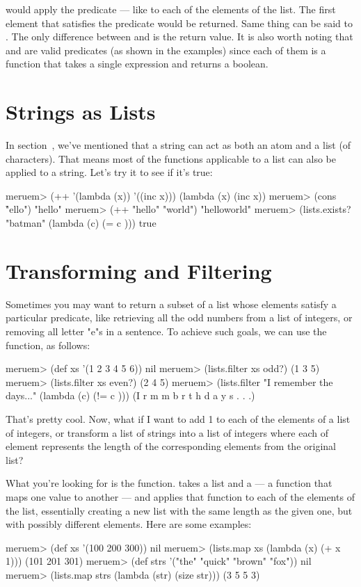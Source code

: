  would apply the predicate --- like  to each of the elements of the list. The first element that satisfies the predicate would be returned. Same thing can be said to . The only difference between  and  is the return value. It is also worth noting that  and  are valid predicates (as shown in the examples) since each of them is a function that takes a single expression and returns a boolean. 

\section{Strings as Lists}
In section~, we've mentioned that a string can act as both an atom and a list (of characters). That means most of the functions applicable to a list can also be applied to a string. Let's try it to see if it's true:

\begin{REPL}
meruem> (++ '(lambda (x)) '((inc x)))
(lambda (x) (inc x))
meruem> (cons \h "ello")
"hello"
meruem> (++ "hello" "world")
"helloworld"
meruem> (lists.exists? "batman" (lambda (c) (= c \a)))
true
\end{REPL}

\section{Transforming and Filtering}
Sometimes you may want to return a subset of a list whose elements satisfy a particular predicate, like retrieving all the odd numbers from a list of integers, or removing all letter "e"s in a sentence. To achieve such goals, we can use the  function, as follows:

\begin{REPL}
meruem> (def xs '(1 2 3 4 5 6))
nil
meruem> (lists.filter xs odd?) 
(1 3 5)
meruem> (lists.filter xs even?)
(2 4 5)
meruem> (lists.filter "I remember the days..." (lambda (c) (!= c \e)))
(I   r m m b r   t h   d a y s . . .)
\end{REPL}

That's pretty cool. Now, what if I want to add 1 to each of the elements of a list of integers, or transform a list of strings into a list of integers where each of element represents the length of the corresponding elements from the original list?

What you're looking for is the  function.  takes a list and a  --- a function that maps one value to another --- and applies that function to each of the elements of the list, essentially creating a new list with the same length as the given one, but with possibly different elements. Here are some examples:

\begin{REPL}
meruem> (def xs '(100 200 300))
nil
meruem> (lists.map xs (lambda (x) (+ x 1)))
(101 201 301)
meruem> (def strs '("the" "quick" "brown" "fox"))
nil
meruem> (lists.map strs (lambda (str) (size str)))
(3 5 5 3)
\end{REPL}
